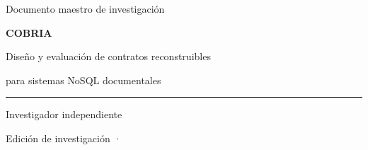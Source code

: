\begin{titlepage}
\centering
\vspace*{2.2cm}
{\Large Documento maestro de investigación\par}
\vspace{1.5cm}
{\Huge\bfseries COBRIA\par}
\vspace{0.6cm}
{\LARGE Diseño y evaluación de contratos reconstruibles\par}
\vspace{0.35cm}
{\Large para sistemas NoSQL documentales\par}
\vspace{1.2cm}
\rule{0.72\textwidth}{0.7pt}
\vfill
{\large \COBRIAAutor\par}
\vspace{0.35cm}
{\normalsize Investigador independiente\par}
{\normalsize \COBRIALugar\par}
\vspace{1cm}
{\normalsize Edición de investigación · \COBRIAAnio\par}
\end{titlepage}
